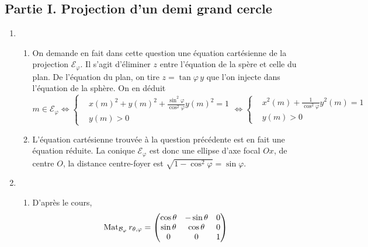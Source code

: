 \subsection*{Partie I. Projection d'un demi grand cercle}
\begin{enumerate}
 \item
\begin{enumerate}
 \item On demande en fait dans cette question une équation cartésienne de la projection $\mathcal{E}_\varphi$. Il s'agit d'éliminer $z$ entre l'équation de la spère et celle du plan. De l'équation du plan, on tire $z = \tan\varphi \,y$ que l'on injecte dans l'équation de la sphère. On en déduit
\begin{displaymath}
 m\in\mathcal{E}_\varphi
\Leftrightarrow
\left\lbrace 
\begin{aligned}
&x(m)^2 + y(m)^2 + \frac{\sin^2 \varphi}{\cos^2 \varphi}y(m)^2=1\\
&y(m)>0
\end{aligned}
\right. 
\Leftrightarrow
\left\lbrace 
\begin{aligned}
 &x^2(m) + \frac{1}{\cos^2 \varphi}y^2(m)=1\\
 &y(m)>0
\end{aligned}
\right. 
\end{displaymath}
 \item L'équation cartésienne trouvée à la question précédente est en fait une équation réduite. La conique $\mathcal{E}_\varphi$ est donc une ellipse d'axe focal $Ox$, de centre $O$, la distance centre-foyer est $\sqrt{1-\cos^2\varphi}=\sin\varphi$.
\end{enumerate}
 
 \item
\begin{enumerate}
 \item D'après le cours,
\begin{displaymath}
 \operatorname{Mat}_{\mathcal{B}_\varphi}r_{\theta,\varphi}=
\begin{pmatrix}
 \cos \theta & -\sin \theta & 0 \\ \sin \theta & \cos \theta & 0 \\ 0 & 0 & 1
\end{pmatrix}
\end{displaymath}


\end{enumerate}
\end{enumerate}
